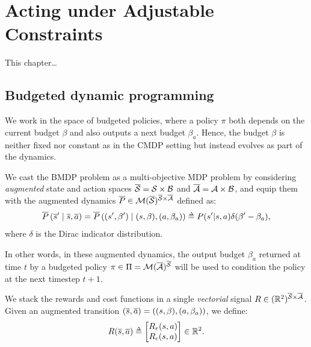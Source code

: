 
\graphicspath{{2-Chapters/5-Chapter/}}

\chapter{Acting under Adjustable Constraints}
\label{chapter:5}

\abstractStartChapter{}%
This chapter\dots
\minitocStartChapter{}

\section{Budgeted dynamic programming}
\label{sec:bdp}
We work in the space of budgeted policies, where a policy $\pi$ both depends on the current budget $\beta$ and also outputs a next budget $\beta_a$. Hence, the budget $\beta$ is neither fixed nor constant as in the CMDP setting but instead evolves as part of the dynamics.

We cast the BMDP problem as a multi-objective MDP problem \citep{Roijers2013ASO} by considering \emph{augmented} state and action spaces $\overline{\mathcal{S}} = \mathcal{S}\times \mathcal{B}$ and $\overline{\mathcal{A}}= \mathcal{A}\times \mathcal{B}$, and equip them with the augmented dynamics $\overline{P}\in \mathcal{M}(\overline{\mathcal{S}})^{\overline{\mathcal{S}} \times \overline{\mathcal{A}}}$ defined as:
\begin{equation}
\label{eq:augmented-dynamics}
\ov{P}\left(\os' \condbar \os, \oa\right) = \ov{P}\left((s',\beta') \condbar (s,\beta), (a, \beta_a)\right) \eqdef P(s'|s, a)\delta(\beta' - \beta_a),
\end{equation}
where $\delta$ is the Dirac indicator distribution.

In other words, in these augmented dynamics, the output budget $\beta_a$ returned at time $t$ by a budgeted policy $\pi\in \Pi=\mathcal{M}(\overline{\mathcal{A}})^{\overline{\mathcal{S}}}$ will be used to condition the policy at the next timestep $t+1$.

We stack the rewards and cost functions in a single \emph{vectorial} signal $R \in (\mathbb{R}^2)^{{\overline{\mathcal{S}} \times \overline{\mathcal{A}}}}$.
Given an augmented transition $(\overline{s}, \overline{a}) =((s,\beta), (a, \beta_a))$, we define:
\begin{equation}
R(\os, \oa) \eqdef  \begin{bmatrix}
R_r(s, a)\\
R_c(s, a)
\end{bmatrix}\in\Real^2.
\end{equation}



